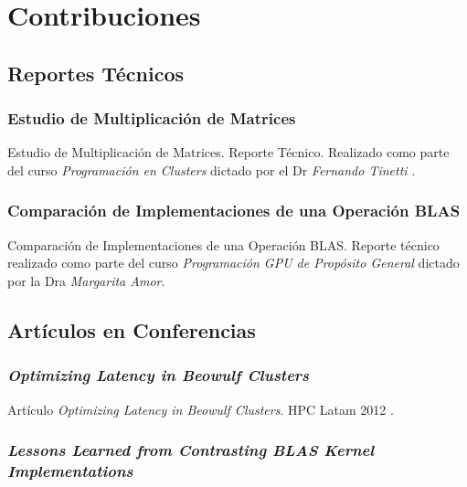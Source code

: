 \documentclass[a4paper]{report}
\begin{document}
\chapter{Contribuciones} \label{contributions}

\section{Reportes Técnicos}

\subsection{Estudio de Multiplicación de Matrices}

Estudio de Multiplicación de Matrices. Reporte Técnico. Realizado como parte del curso {\it Programación en Clusters} dictado por el Dr {\it Fernando Tinetti} \cite{mm-tool}.



\subsection{Comparación de Implementaciones de una Operación BLAS}

Comparación de Implementaciones de una Operación BLAS. Reporte técnico realizado como parte del curso {\it Programación GPU de Propósito General} dictado por la Dra {\it Margarita Amor}.



\section{Artículos en Conferencias}

\subsection{\it Optimizing Latency in Beowulf Clusters}

Artículo {\it Optimizing Latency in Beowulf Clusters}. HPC Latam 2012 \cite{latency}.



\subsection{{\it Lessons Learned from Contrasting BLAS Kernel Implementations}}
\end{document}
